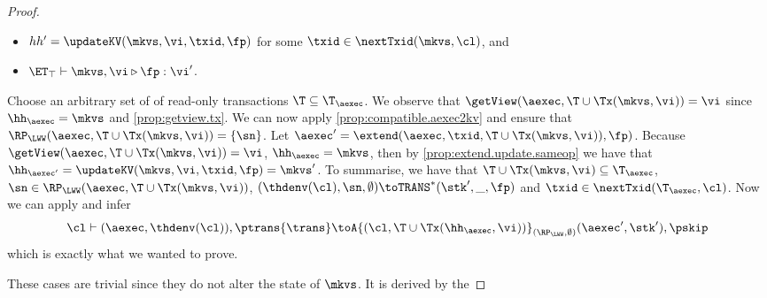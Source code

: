 \begin{proof}
\begin{itemize}
\item $hh' = \updateKV(\mkvs, \vi, \txid, \fp)$ for some $\txid \in \nextTxid(\mkvs, \cl)$, and
\item $\ET_{\top} \vdash \mkvs, \vi \triangleright \fp: \vi'$.
\end{itemize}
Choose an arbitrary set of of read-only transactions $\T \subseteq \T_{\aexec}$.
We observe that $\getView(\aexec, \T \cup \Tx(\mkvs, \vi)) = \vi$ since $\hh_{\aexec} = \mkvs$ and \cref{prop:getview.tx}.
We can now apply \cref{prop:compatible.aexec2kv} and ensure that $\RP_{\LWW}(\aexec, \T \cup \Tx(\mkvs, \vi)) = \{\sn\}$.
Let $\aexec' = \extend(\aexec, \txid, \T \cup \Tx(\mkvs, \vi)), \fp)$. 
Because $\getView(\aexec, \T \cup \Tx(\mkvs, \vi)) = \vi$, $\hh_{\aexec} = \mkvs$,
then by \cref{prop:extend.update.sameop} we have that $\hh_{\aexec'} = \updateKV(\mkvs, \vi, \txid, \fp) = \mkvs'$. 
To summarise, we have that $\T \cup \Tx(\mkvs, \vi) \subseteq \T_{\aexec}$, $\sn \in \RP_{\LWW}(\aexec, \T \cup \Tx(\mkvs, \vi))$,
$(\thdenv(\cl), \sn, \emptyset) \toTRANS^{\ast} (\stk', \_, \fp)$ and $\txid \in \nextTxid(\T_{\aexec}, \cl)$. 
Now we can apply  and infer
\[
\cl \vdash (\aexec, \thdenv(\cl)), \ptrans{\trans} \toA{(\cl, \T \cup \Tx(\hh_{\aexec}, \vi))}_{(\RP_{\LWW}, \emptyset)} 
(\aexec', \stk'), \pskip
\]
which is exactly what we wanted to prove. 

These cases are trivial since they do not alter the state of \( \mkvs \).
It is derived by the \ih
\end{proof}

